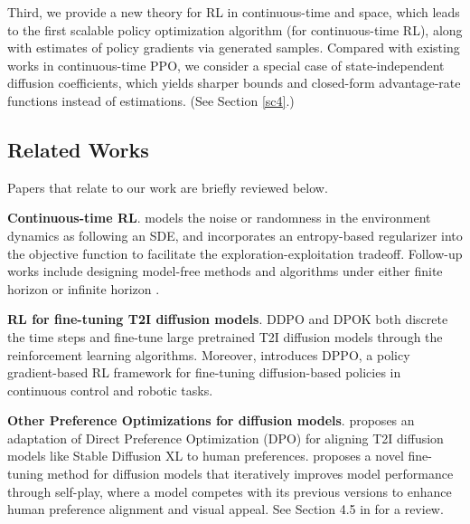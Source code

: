 \documentclass{article}
\theoremstyle{plain}
\theoremstyle{definition}
\theoremstyle{remark}
\begin{document}
Third, we provide a new theory for RL in continuous-time and space, which leads to the first scalable policy optimization algorithm (for continuous-time RL), along with estimates of policy gradients via generated samples. Compared with existing works in continuous-time PPO, we consider a special case of state-independent diffusion coefficients, which yields sharper bounds and closed-form advantage-rate functions instead of estimations. (See Section \ref{sc4}.)

\subsection{Related Works}
Papers that relate to our work are briefly reviewed below.

\textbf{Continuous-time RL}. \cite{wang2020reinforcement} models the noise or randomness in the environment dynamics as following an SDE, and incorporates an entropy-based regularizer into the objective function to facilitate the exploration-exploitation tradeoff. Follow-up works include designing model-free methods and algorithms under either finite horizon \cite{jia2022policy_evaluation, jia2022policy_gradient, jia2022q_learning} or infinite horizon \cite{zhao2024policy}. 

\textbf{RL for fine-tuning T2I diffusion models}. DDPO \cite{DDPO} and DPOK \cite{DPOK} both discrete the time steps and fine-tune large pretrained T2I diffusion models through the reinforcement learning algorithms. Moreover, \cite{dppo} introduces DPPO, a policy gradient-based RL framework for fine-tuning diffusion-based policies in continuous control and robotic tasks.

\textbf{Other Preference Optimizations for diffusion models}. \cite{diffusiondpo} proposes an adaptation of Direct Preference Optimization (DPO) for aligning T2I diffusion models like Stable Diffusion XL to human preferences. 
\cite{yuan2024self} proposes a novel fine-tuning method for diffusion models that iteratively improves model performance through self-play, where a model competes with its previous versions to enhance human preference alignment and visual appeal. 
See Section 4.5 in \cite{winata2024preference} for a review.
\end{document}

